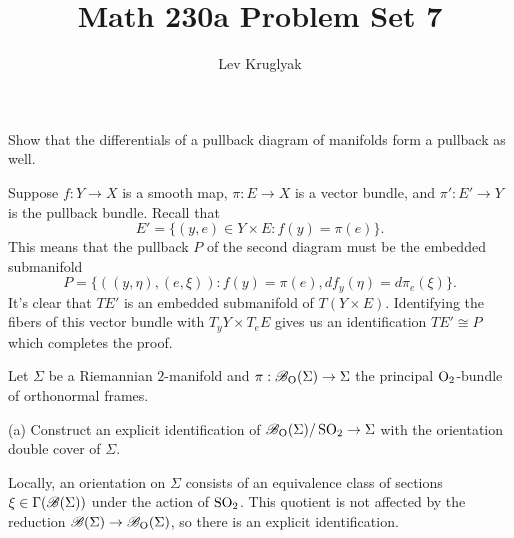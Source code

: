 \documentclass{../../templates/lkx_pset}
\title{Math 230a Problem Set 7}
\author{Lev Kruglyak}
\begin{document}
\maketitle

\begin{problem}{1}
  Show that the differentials of a pullback diagram of manifolds form a pullback as well.
\end{problem}

\begin{solution}
  Suppose $f : Y \to X$ is a smooth map, $\pi : E \to X$ is a vector bundle, and $\pi' : E' \to Y$ is the pullback bundle. Recall that 
  \[
    E' = \{ (y, e)\in Y\times E : f(y)=\pi(e)\}.
  \]
  This means that the pullback $P$ of the second diagram must be the embedded submanifold 
  \[
    P = \{ ((y,\eta), (e, \xi)) : f(y)=\pi(e), df_y(\eta) = d\pi_e(\xi)\}.
  \]
  It's clear that $TE'$ is an embedded submanifold of $T(Y\times E)$. Identifying the fibers of this vector bundle with $T_y Y\times T_e E$ gives us an identification $TE' \cong P$ which completes the proof.
\end{solution}

\begin{problem}{2}
  Let $\Sigma$ be a Riemannian $2$-manifold and $\pi : \mathscr{B}_{\operatorname{O}}(\Sigma) \to \Sigma$ the principal ${\operatorname{O}}_2$-bundle of orthonormal frames.
\end{problem}
\begin{parts}
  \begin{part}{(a)}
    Construct an explicit identification of $\mathscr{B}_{{\operatorname{O}}}(\Sigma) / \operatorname{SO}_2 \to \Sigma$ with the orientation double cover of $\Sigma$.
  \end{part}
  
  Locally, an orientation on $\Sigma$ consists of an equivalence class of sections $\xi \in \Gamma(\mathscr{B}(\Sigma))$ under the action of $\operatorname{SO}_2$. This quotient is not affected by the reduction $\mathscr{B}(\Sigma) \to \mathscr{B}_{\operatorname{O}}(\Sigma)$, so there is an explicit identification.
\end{parts}
\end{document}

